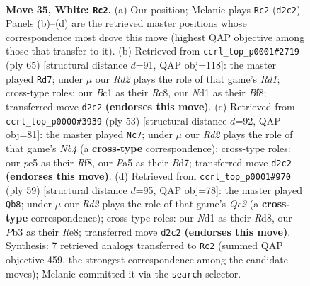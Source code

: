 \documentclass[11pt]{article}
\begin{document}
\begin{figure}[p]
\label{fig:thought-m66}
\end{figure}

\clearpage

\begin{figure}[p]\centering
\begin{subfigure}{0.46\textwidth}\centering
\resizebox{\linewidth}{!}{%
\newchessgame
\chessboard[
  setfen={1r4k1/p1nqbrn1/b7/P1p2p1p/3p1Pp1/1P4P1/Q2RP1BP/1RBNN1K1 w - - 2 35},
  showmover=false,
  pgfstyle=straightmove, color=movearrow, markmove={d2-c2}
]}
\caption{}
\end{subfigure}\hfill
\begin{subfigure}{0.46\textwidth}\centering
\resizebox{\linewidth}{!}{%
\newchessgame
\chessboard[
  setfen={q1rr1bk1/5pp1/1pb1pn1p/p7/P2PP3/3BRN1P/R2B1PP1/1Q4K1 b - - 4 33},
  showmover=false,
  pgfstyle=straightmove, color=movearrow, markmove={d8-d7}
]}
\caption{}
\end{subfigure}
\\[4pt]
\begin{subfigure}{0.46\textwidth}\centering
\resizebox{\linewidth}{!}{%
\newchessgame
\chessboard[
  setfen={3q1rk1/r2bb1pp/8/pn1pPp2/2pP1P2/2P2Q2/2B1N1PP/R1B1R1K1 b - - 1 27},
  showmover=false,
  pgfstyle=straightmove, color=movearrow, markmove={b5-c7}
]}
\caption{}
\end{subfigure}\hfill
\begin{subfigure}{0.46\textwidth}\centering
\resizebox{\linewidth}{!}{%
\newchessgame
\chessboard[
  setfen={3rr1k1/1bqnbpp1/pp1pp2p/8/P1PBPP2/1PN3PP/1Q1R2BK/3R4 b - - 18 30},
  showmover=false,
  pgfstyle=straightmove, color=movearrow, markmove={c7-b8}
]}
\caption{}
\end{subfigure}
\caption{\textbf{Move 35, White: \texttt{Rc2}.} (a) Our position; Melanie plays \texttt{Rc2} (\texttt{d2c2}). Panels (b)--(d) are the retrieved master positions whose correspondence most drove this move (highest QAP objective among those that transfer to it). (b) Retrieved from \texttt{ccrl\_top\_p0001\#2719} (ply 65) [structural distance $d$=91, QAP obj=118]: the master played \texttt{Rd7}; under $\mu$ our \emph{Rd2} plays the role of that game's \emph{Rd1}; cross-type roles: our \emph{B}c1 as their \emph{R}c8, our \emph{N}d1 as their \emph{B}f8; transferred move \texttt{d2c2} \textbf{(endorses this move)}. (c) Retrieved from \texttt{ccrl\_top\_p0000\#3939} (ply 53) [structural distance $d$=92, QAP obj=81]: the master played \texttt{Nc7}; under $\mu$ our \emph{Rd2} plays the role of that game's \emph{Nb4} (a \textbf{cross-type} correspondence); cross-type roles: our \emph{p}c5 as their \emph{R}f8, our \emph{P}a5 as their \emph{B}d7; transferred move \texttt{d2c2} \textbf{(endorses this move)}. (d) Retrieved from \texttt{ccrl\_top\_p0001\#970} (ply 59) [structural distance $d$=95, QAP obj=78]: the master played \texttt{Qb8}; under $\mu$ our \emph{Rd2} plays the role of that game's \emph{Qc2} (a \textbf{cross-type} correspondence); cross-type roles: our \emph{N}d1 as their \emph{R}d8, our \emph{P}b3 as their \emph{R}e8; transferred move \texttt{d2c2} \textbf{(endorses this move)}. Synthesis: 7 retrieved analogs transferred to \texttt{Rc2} (summed QAP objective 459, the strongest correspondence among the candidate moves); Melanie committed it via the \texttt{search} selector.}

\end{figure}
\end{document}
